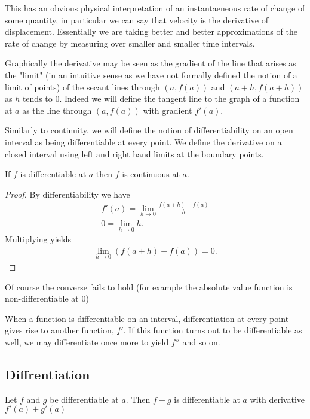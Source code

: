 \documentclass[]{article}
\begin{document}
This has an obvious physical interpretation of an instantaeneous rate of change of some quantity, in particular we can say that velocity is the derivative of displacement. Essentially we are taking better and better approximations of the rate of change by measuring over smaller and smaller time intervals.

Graphically the derivative may be seen as the gradient of the line that arises as the "limit" (in an intuitive sense as we have not formally defined the notion of a limit of points) of the secant lines through $(a, f(a))$ and $(a+h, f(a+h))$ as $h$ tends to $0$. Indeed we will define the tangent line to the graph of a function at $a$ as the line through $(a,f(a))$ with gradient $f'(a)$.

Similarly to continuity, we will define the notion of differentiability on an open interval as being differentiable at every point. We define the derivative on a closed interval using left and right hand limits at the boundary points.

\begin{thm} 
	If $f$ is differentiable at $a$ then $f$ is continuous at $a$.	
\end{thm}

\begin{proof}
		By differentiability we have 
		\begin{align*}
				f'(a) = \lim_{h\to 0} \frac{f(a+h)-f(a)}{h} \\
				0 = \lim_{h\to 0} h.
		\end{align*}
		Multiplying yields
		\begin{align*}
				\lim_{h \to 0} (f(a+h) - f(a)) = 0.
		\end{align*}
\end{proof}

Of course the converse fails to hold (for example the absolute value function is non-differentiable at $0$) 

When a function is differentiable on an interval, differentiation at every point gives rise to another function, $f'$. If this function turns out to be differentiable as well, we may differentiate once more to yield $f'' $ and so on. 

\subsection{Diffrentiation}

\begin{thm} 
		Let $f$ and $g$ be differentiable at $a$. Then $f+g$ is differentiable at $a$ with derivative $f'(a) + g'(a)$	
\end{thm}
\end{document}
